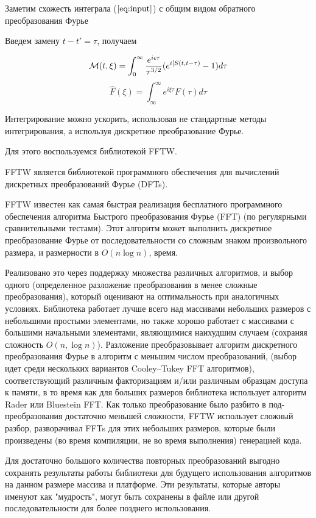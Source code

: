 \documentclass[14pt, a4paper]{article}
\numberwithin{figure}{section}
\numberwithin{equation}{section}
\newcommand{\cM}{\mathcal{M}}
\begin{document}
Заметим схожесть интеграла ($\ref{eq:input}$) с общим видом обратного преобразования Фурье

Введем замену $t - t' = \tau$, получаем

\begin{equation}\label{eq:fourier}
\cM (t, \xi) = \int_{0}^{\infty}\frac{e^{i\epsilon \tau}}{{\tau}^{3/2}}(e^{i [S(t, t-\tau)} - 1) d\tau\\ 
\end{equation}
$$\hat{F}(\xi) = \int_{\infty}^{\infty}e^{i\xi \tau} F(\tau) d\tau $$

Интегрирование можно ускорить, использовав не стандартные методы интегрирования, а используя дискретное преобразование Фурье.

Для этого воспользуемся библиотекой FFTW.

FFTW является библиотекой программного обеспечения для вычислений дискретных преобразований Фурье (DFTs).\cite{fftw:website}

FFTW известен как самая быстрая реализация бесплатного программного обеспечения алгоритма Быстрого преобразования Фурье (FFT) (по регулярными сравнительными тестами). Этот алгоритм может выполнить дискретное преобразование Фурье от последовательности со сложным знаком произвольного размера, и размерности в $O (n \log n)$, время.

Реализовано это через поддержку множества различных алгоритмов, и выбор одного (определенное разложение преобразования в менее сложные преобразования), который оценивают на оптимальность при аналогичных условиях. Библиотека работает лучше всего над массивами небольших размеров с небольшими простыми элементами, но также хорошо работает с массивами с большими начальными элементами, являющимися наихудшим случаем (сохраняя сложность $O (n, \log n)$). Разложение преобразовывает алгоритм дискретного преобразования Фурье в алгоритм с  меньшим числом преобразований, (выбор идет среди нескольких вариантов Cooley–Tukey FFT алгоритмов), соответствующий различным факторизациям и/или различным образцам доступа к памяти, в то время как для больших размеров библиотека использует алгоритм Rader или Bluestein FFT. Как только преобразование было разбито в под-преобразования достаточно меньшей сложности, FFTW использует сложный разбор, разворачивал FFTs для этих небольших размеров, которые были произведены (во время компиляции, не во время выполнения) генерацией кода.

Для достаточно большого количества повторных преобразований выгодно сохранять результаты работы библиотеки для будущего использования алгоритмов на данном размере массива и платформе. Эти результаты, которые авторы именуют как "мудрость", могут быть сохранены в файле или другой последовательности для более позднего использования.
\end{document}
